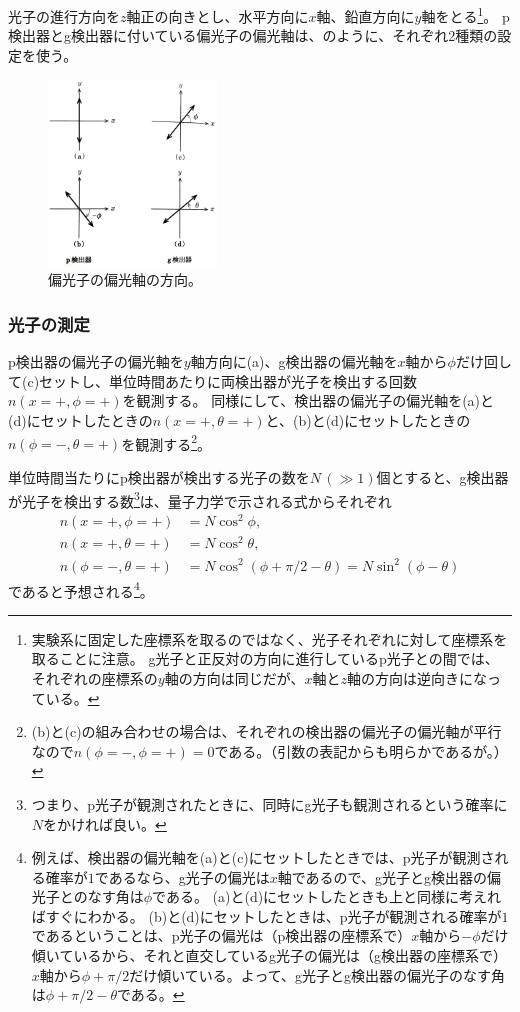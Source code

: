 \documentclass[10pt,b5paper,papersize,dvipdfmx]{jsbook}
\begin{document}
光子の進行方向を$z$軸正の向きとし、水平方向に$x$軸、鉛直方向に$y$軸をとる\footnote{
  実験系に固定した座標系を取るのではなく、光子それぞれに対して座標系を取ることに注意。
  g光子と正反対の方向に進行しているp光子との間では、それぞれの座標系の$y$軸の方向は同じだが、$x$軸と$z$軸の方向は逆向きになっている。
}。
p検出器とg検出器に付いている偏光子の偏光軸は、のように、それぞれ2種類の設定を使う。

\begin{figure}[ht]
  \centering
  \includegraphics[width=45mm]{nkym/fig/henkou-jiku.jpeg}
  \caption{偏光子の偏光軸の方向。} %
  \label{fig:henkou-jiku}
\end{figure}

%
\subsubsection{光子の測定} %

p検出器の偏光子の偏光軸を$y$軸方向に(a)、g検出器の偏光軸を$x$軸から$\phi$だけ回して(c)セットし、単位時間あたりに両検出器が光子を検出する回数$n(x=+,\phi=+)$を観測する。
同様にして、検出器の偏光子の偏光軸を(a)と(d)にセットしたときの$n(x=+,\theta=+)$と、(b)と(d)にセットしたときの$n(\phi=-,\theta=+)$を観測する\footnote{
  (b)と(c)の組み合わせの場合は、それぞれの検出器の偏光子の偏光軸が平行なので$n(\phi=-, \phi=+) = 0$である。（引数の表記からも明らかであるが。）
}。\par
単位時間当たりにp検出器が検出する光子の数を$N \,(\gg 1)$個とすると、g検出器が光子を検出する数\footnote{
  つまり、p光子が観測されたときに、同時にg光子も観測されるという確率に$N$をかければ良い。
}は、量子力学で示される式からそれぞれ
\begin{align}
  \label{eq:photon-1} n(x=+,\phi=+)      &= N \cos^2\phi, \\
  \label{eq:photon-2} n(x=+,\theta=+)    &= N \cos^2\theta, \\
  \label{eq:photon-3} n(\phi=-,\theta=+) &= N \cos^2(\phi + \pi/2 - \theta) = N \sin^2(\phi - \theta)
\end{align}
であると予想される\footnote{
  例えば、検出器の偏光軸を(a)と(c)にセットしたときでは、p光子が観測される確率が$1$であるなら、g光子の偏光は$x$軸であるので、g光子とg検出器の偏光子とのなす角は$\phi$である。
  (a)と(d)にセットしたときも上と同様に考えればすぐにわかる。
  (b)と(d)にセットしたときは、p光子が観測される確率が$1$であるということは、p光子の偏光は（p検出器の座標系で）$x$軸から$-\phi$だけ傾いているから、それと直交しているg光子の偏光は（g検出器の座標系で）$x$軸から$\phi + \pi/2$だけ傾いている。よって、g光子とg検出器の偏光子のなす角は$\phi + \pi/2 - \theta$である。
}。
\end{document}
